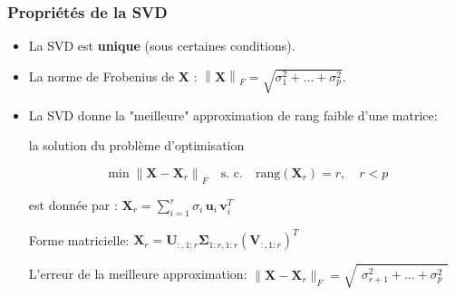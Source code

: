 \documentclass[9pt]{beamer}
\begin{document}
\begin{frame}
	
	\frametitle{Propriétés de la SVD}
	
	\begin{itemize}[label=\tiny$\blacksquare$]
	\item La SVD est \textbf{unique} (sous certaines conditions).\\[3ex]
	
	\item La norme de Frobenius de $\mathbf{X}$ : $\left\lVert \mathbf{X} \right\rVert_F= \sqrt{\sigma_1^2 +\dots +\sigma_p^2} .$\\[3ex]
	
	\item La SVD donne la "meilleure" approximation de rang faible d'une matrice: 
	\begin{tcolorbox}	
	la solution du problème d'optimisation
	
	$$
	\min\left\lVert \mathbf{X} - \mathbf{X}_r \right\rVert_F \quad \text{s. c.} \quad \text{rang}( \mathbf{X}_r) =r, \quad r<p
	$$
	
	est donnée par : $
	\boxed{\mathbf{X}_r =  \sum_{i=1}^r \sigma_i \, \mathbf{u}_i \,  \mathbf{v}_i^T}$
	\end{tcolorbox}
	
	\vfill
	
	Forme matricielle: $\mathbf{X}_r = \mathbf{U}_{:,1:r} \bm{\Sigma}_{1:r,1:r} (\mathbf{V}_{:,1:r})^{T}$
	
	L'erreur de la meilleure approximation: $\lVert \mathbf{X} - \mathbf{X}_r \rVert_F = \sqrt{\begin{smallmatrix}\sigma_{r+1}^2 +\dots +\sigma_p^2\end{smallmatrix}}$
	
	
	\end{itemize}	
\end{frame}	
\end{document}
